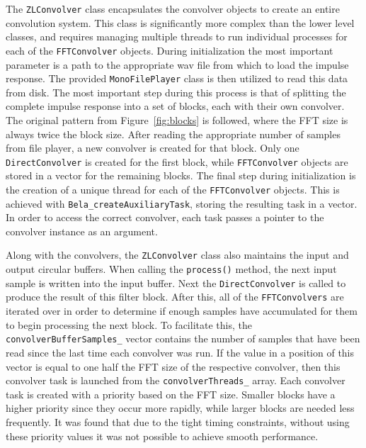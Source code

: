 \documentclass{article}
\begin{document}
The \texttt{ZLConvolver} class encapsulates the convolver objects to create an entire convolution system. 
This class is significantly more complex than the lower level classes, and requires managing multiple threads
to run individual processes for each of the \texttt{FFTConvolver} objects.
During initialization the most important parameter is a path to the appropriate wav file from which to load the impulse response. 
The provided \texttt{MonoFilePlayer} class is then utilized to read this data from disk.
The most important step during this process is that of splitting the complete impulse response into a set of blocks, each with their own convolver. 
The original pattern from Figure~\ref{fig:blocks} is followed, where the FFT size is always twice the block size. 
After reading the appropriate number of samples from file player, a new convolver is created for that block. 
Only one \texttt{DirectConvolver} is created for the first block, while \texttt{FFTConvolver} objects are stored in a vector for the remaining blocks. 
The final step during initialization is the creation of a unique thread for each of the \texttt{FFTConvolver} objects.
This is achieved with \texttt{Bela\_createAuxiliaryTask}, storing the resulting task in a vector. 
In order to access the correct convolver, each task passes a pointer to the convolver instance as an argument. 

Along with the convolvers, the \texttt{ZLConvolver} class also maintains the input and output circular buffers. 
When calling the \texttt{process()} method, the next input sample is written into the input buffer. 
Next the \texttt{DirectConvolver} is called to produce the result of this filter block. 
After this, all of the \texttt{FFTConvolvers} are iterated over in order to determine if enough samples 
have accumulated for them to begin processing the next block. 
To facilitate this, the \texttt{convolverBufferSamples\_} vector contains the number of samples 
that have been read since the last time each convolver was run. 
If the value in a position of this vector is equal to one half the FFT size of the respective convolver, 
then this convolver task is launched from the \texttt{convolverThreads\_} array. 
Each convolver task is created with a priority based on the FFT size.
Smaller blocks have a higher priority since they occur more rapidly, while larger blocks are needed less frequently. 
It was found that due to the tight timing constraints, without using these priority values it was not possible to achieve smooth performance.
\end{document}
